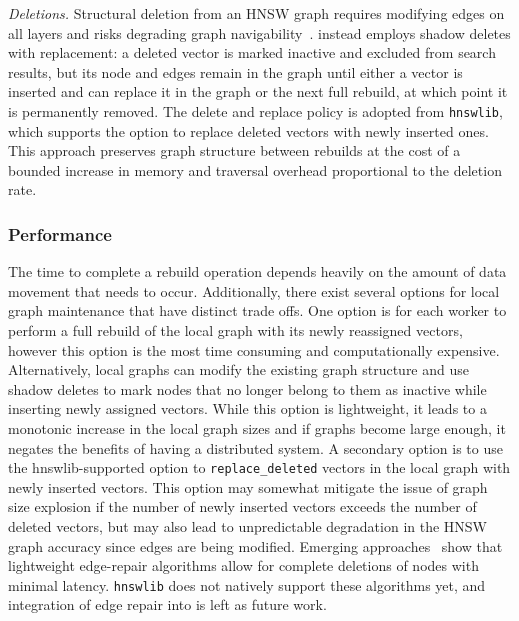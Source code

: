 \documentclass[sigconf,review,anonymous]{acmart}
\begin{document}
    \textit{Deletions.} Structural deletion from an HNSW graph requires modifying edges on all layers and risks degrading graph navigability~\cite{yu2025topology, xiao2024enhancing, xu2025place}. \SystemName{} instead employs shadow deletes with replacement: a deleted vector is marked inactive and excluded from search results, but its node and edges remain in the graph until either a vector is inserted and can replace it in the graph or the next full rebuild, at which point it is permanently removed. The delete and replace policy is adopted from \texttt{hnswlib}, which supports the option to replace deleted vectors with newly inserted ones. This approach preserves graph structure between rebuilds at the cost of a bounded increase in memory and traversal overhead proportional to the deletion rate.

\subsubsection{Performance}
    The time to complete a rebuild operation depends heavily on the amount of data movement that needs to occur. Additionally, there exist several options for local graph maintenance that have distinct trade offs. One option is for each worker to perform a full rebuild of the local graph with its newly reassigned vectors, however this option is the most time consuming and computationally expensive. Alternatively, local graphs can modify the existing graph structure and use shadow deletes to mark nodes that no longer belong to them as inactive while inserting newly assigned vectors. While this option is lightweight, it leads to a monotonic increase in the local graph sizes and if graphs become large enough, it negates the benefits of having a distributed system. A secondary option is to use the hnswlib-supported option to \texttt{replace\_deleted} vectors in the local graph with newly inserted vectors. This option may somewhat mitigate the issue of graph size explosion if the number of newly inserted vectors exceeds the number of deleted vectors, but may also lead to unpredictable degradation in the HNSW graph accuracy since edges are being modified. Emerging approaches~\cite{yu2025topology, xiao2024enhancing, xu2025place} show that lightweight edge-repair algorithms allow for complete deletions of nodes with minimal latency. \texttt{hnswlib} does not natively support these algorithms yet, and integration of edge repair into \SystemName{} is left as future work.
    
\end{document}
